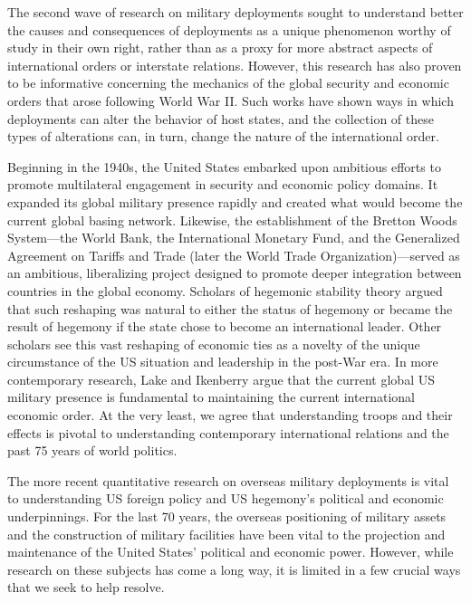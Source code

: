 The second wave of research on military deployments sought to understand better the causes and consequences of deployments as a unique phenomenon worthy of study in their own right, rather than as a proxy for more abstract aspects of international orders or interstate relations. However, this research has also proven to be informative concerning the mechanics of the global security and economic orders that arose following World War II. Such works have shown ways in which deployments can alter the behavior of host states, and the collection of these types of alterations can, in turn, change the nature of the international order. 

Beginning in the 1940s, the United States embarked upon ambitious efforts to promote multilateral engagement in security and economic policy domains. It expanded its global military presence rapidly and created what would become the current global basing network. Likewise, the establishment of the Bretton Woods System---the World Bank, the International Monetary Fund, and the Generalized Agreement on Tariffs and Trade (later the World Trade Organization)---served as an ambitious, liberalizing project designed to promote deeper integration between countries in the global economy. Scholars of hegemonic stability theory argued that such reshaping was natural to either the status of hegemony or became the result of hegemony if the state chose to become an international leader.\autocite{kindleberger1973,krasner1976}  Other scholars see this vast reshaping of economic ties as a novelty of the unique circumstance of the US situation and leadership in the post-War era. In more contemporary research, Lake and Ikenberry argue that the current global US military presence is fundamental to maintaining the current international economic order.\autocite{Lake2009b,Ikenberry2011} At the very least, we agree that understanding troops and their effects is pivotal to understanding contemporary international relations and the past 75 years of world politics. 

The more recent quantitative research on overseas military deployments is vital to understanding US foreign policy and US hegemony's political and economic underpinnings. For the last 70 years, the overseas positioning of military assets and the construction of military facilities have been vital to the projection and maintenance of the United States' political and economic power. However, while research on these subjects has come a long way, it is limited in a few crucial ways that we seek to help resolve. 


